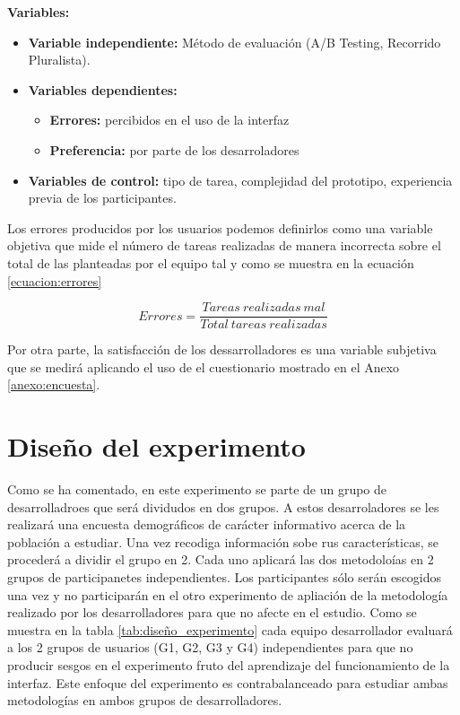 \documentclass[a4paper,12pt]{report}
\begin{document}
\textbf{Variables:}
\begin{itemize}
    \item \textbf{Variable independiente:} Método de evaluación (A/B Testing, Recorrido Pluralista).
    \item \textbf{Variables dependientes:}
    \begin{itemize}
        \item \textbf{Errores:} percibidos en el uso de la interfaz
        \item \textbf{Preferencia:} por parte de los desarroladores
    \end{itemize}
    \item \textbf{Variables de control:} tipo de tarea, complejidad del prototipo, experiencia previa de los participantes.
\end{itemize}

Los errores producidos por los usuarios podemos definirlos como una variable objetiva que mide el número de tareas realizadas de manera incorrecta sobre el total de las planteadas por el equipo tal y como se muestra en la ecuación \ref{ecuacion:errores}

\begin{equation}
Errores = \frac{Tareas\ realizadas\ mal}{Total\ tareas\ realizadas}
\label{ecuacion:errores}
\end{equation}

Por otra parte, la satisfacción de los dessarrolladores es una variable subjetiva que se medirá aplicando el uso de el cuestionario mostrado en el Anexo \ref{anexo:encuesta}. 

\section{Diseño del experimento}
Como se ha comentado, en este experimento se parte de un grupo de desarrolladroes que será dividudos en dos grupos. A estos desarroladores se les realizará una encuesta demográficos de carácter informativo acerca de la población a estudiar. Una vez recodiga información sobe rus características, se procederá a dividir el grupo en 2. Cada uno aplicará las dos metodoloías en 2 grupos de participanetes independientes. Los participantes sólo serán escogidos una vez y no participarán en el otro experimento de apliación de la metodología realizado por los desarrolladores para que no afecte en el estudio. Como se muestra en la tabla \ref{tab:diseño_experimento} cada equipo desarrollador evaluará a los 2 grupos de usuarios (G1, G2, G3 y G4) independientes para que no producir sesgos en el experimento fruto del aprendizaje del funcionamiento de la interfaz. Este enfoque del experimento es contrabalanceado para estudiar ambas metodologías en ambos grupos de desarrolladores.
\end{document}
